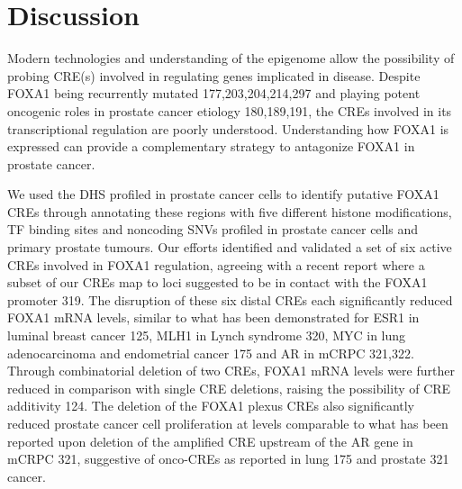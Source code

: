 \section{Discussion}

Modern technologies and understanding of the epigenome allow the possibility of probing CRE(s) involved in regulating genes implicated in disease.
Despite FOXA1 being recurrently mutated 177,203,204,214,297 and playing potent oncogenic roles in prostate cancer etiology 180,189,191, the CREs involved in its transcriptional regulation are poorly understood.
Understanding how FOXA1 is expressed can provide a complementary strategy to antagonize FOXA1 in prostate cancer.

We used the DHS profiled in prostate cancer cells to identify putative FOXA1 CREs through annotating these regions with five different histone modifications, TF binding sites and noncoding SNVs profiled in prostate cancer cells and primary prostate tumours.
Our efforts identified and validated a set of six active CREs involved in FOXA1 regulation, agreeing with a recent report where a subset of our CREs map to loci suggested to be in contact with the FOXA1 promoter 319.
The disruption of these six distal CREs each significantly reduced FOXA1 mRNA levels, similar to what has been demonstrated for ESR1 in luminal breast cancer 125, MLH1 in Lynch syndrome 320, MYC in lung adenocarcinoma and endometrial cancer 175 and AR in mCRPC 321,322.
Through combinatorial deletion of two CREs, FOXA1 mRNA levels were further reduced in comparison with single CRE deletions, raising the possibility of CRE additivity 124.
The deletion of the FOXA1 plexus CREs also significantly reduced prostate cancer cell proliferation at levels comparable to what has been reported upon deletion of the amplified CRE upstream of the AR gene in mCRPC 321, suggestive of onco-CREs as reported in lung 175 and prostate 321 cancer.


